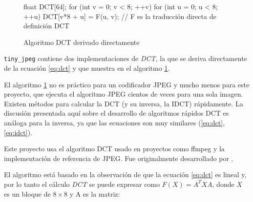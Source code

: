 {\begin{figure}
    \begin{code}[language=C][h]
        float DCT[64];
        for (int v = 0; v < 8; ++v) {
            for (int u = 0; u < 8; ++u) {
                DCT[v*8 + u] = F(u, v);
                // F es la traducción directa de definición DCT
            }
        }
    \end{code}
    \caption{Algoritmo DCT derivado directamente}
    \label{alg:dct}
\end{figure}

\verb+tiny_jpeg+ contiene dos implementaciones de \emph{DCT}, la que se deriva
directamente de la ecuación \ref{eq:dct} y que muestra en el algoritmo \ref{alg:dct}.

El algoritmo \ref{alg:dct} no es práctico para un codificador JPEG y mucho
menos para este proyecto, que ejecuta el algoritmo JPEG cientos de veces para
una sola imagen. Existen métodos para calcular la DCT (y su inversa, la IDCT)
rápidamente. La discusión presentada aquí sobre el desarrollo de algoritmos
rápidos DCT es análoga para la inversa, ya que las ecuaciones son muy similares
(\ref{eq:dct}, \ref{eq:idct}).

Este proyecto usa el algoritmo \gls{DCT} usado en proyectos como ffmpeg y la
implementación de referencia de JPEG. Fue originalmente desarrollado por
\cite{ahmed_dct}.

El algoritmo está basado en la observación de que la ecuación \ref{eq:dct} es
lineal y, por lo tanto el cálculo \emph{DCT} se puede expresar como $F(X) =
A^{T}XA$, donde $X$ es un bloque de $8\times8$ y A es la matriz:

}

